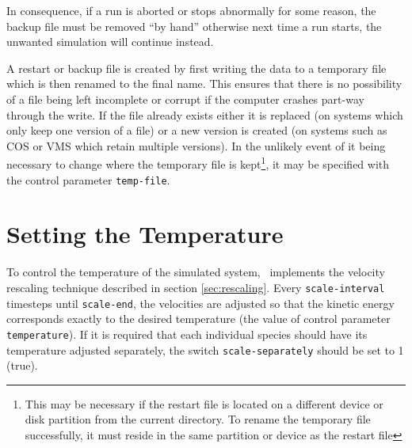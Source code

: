 In consequence, if a run is aborted or stops abnormally for some
reason, the backup file must be removed ``by hand'' otherwise next
time a run starts, the unwanted simulation will continue instead.

A restart or backup file is created by first writing the data to a
temporary file which is then renamed to the final name.  This ensures
that there is no possibility of a file being left incomplete or
corrupt if the computer crashes part-way through the write.  If the
file already exists either it is replaced (on systems which only keep
one version of a file) or a new version is created (on systems such as
COS or VMS which retain multiple versions).  In the unlikely event of
it being necessary to change where the temporary file is
kept\footnote{This may be necessary if the restart file is located on
a different device or disk partition from the current directory. To
rename the temporary file successfully, it must reside in the same
partition or device as the restart file}, it may be specified with the
control parameter
\verb'temp-file'.

\section{Setting the Temperature}

To control the temperature of the simulated system, \moldy\  implements
the velocity rescaling technique described in section
\ref{sec:rescaling}.  Every \verb'scale-interval' timesteps until
\verb'scale-end', the velocities are adjusted so that the kinetic
energy corresponds exactly to the desired temperature (the value of
control parameter \verb'temperature'). If it is required that each
individual species should have its temperature adjusted separately,
the switch \verb'scale-separately' should be set to 1 (true).

